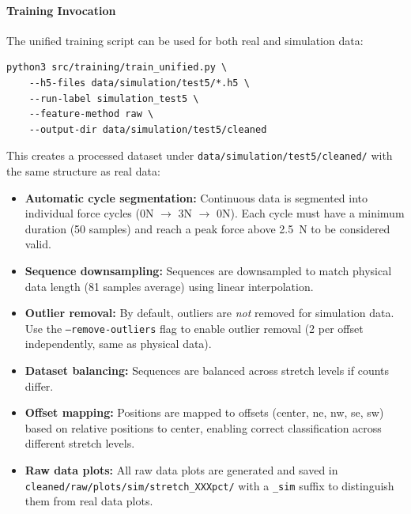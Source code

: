 \documentclass[11pt,a4paper]{article}
\begin{document}
\paragraph{Training Invocation}
The unified training script can be used for both real and simulation data:
\begin{verbatim}
python3 src/training/train_unified.py \
    --h5-files data/simulation/test5/*.h5 \
    --run-label simulation_test5 \
    --feature-method raw \
    --output-dir data/simulation/test5/cleaned
\end{verbatim}
This creates a processed dataset under \texttt{data/simulation/test5/cleaned/} with the same structure as real data:
\begin{itemize}[leftmargin=1.5em]
    \item \textbf{Automatic cycle segmentation:} Continuous data is segmented into individual force cycles
          (0N $\rightarrow$ 3N $\rightarrow$ 0N). Each cycle must have a minimum duration (50 samples) and reach
          a peak force above 2.5~N to be considered valid.
    \item \textbf{Sequence downsampling:} Sequences are downsampled to match physical data length (81 samples average)
          using linear interpolation.
    \item \textbf{Outlier removal:} By default, outliers are \emph{not} removed for simulation data. Use the
          \texttt{--remove-outliers} flag to enable outlier removal (2 per offset independently, same as physical data).
    \item \textbf{Dataset balancing:} Sequences are balanced across stretch levels if counts differ.
    \item \textbf{Offset mapping:} Positions are mapped to offsets (center, ne, nw, se, sw) based on relative
          positions to center, enabling correct classification across different stretch levels.
    \item \textbf{Raw data plots:} All raw data plots are generated and saved in \texttt{cleaned/raw/plots/sim/stretch\_XXXpct/}
          with a \texttt{\_sim} suffix to distinguish them from real data plots.
\end{itemize}
\end{document}
